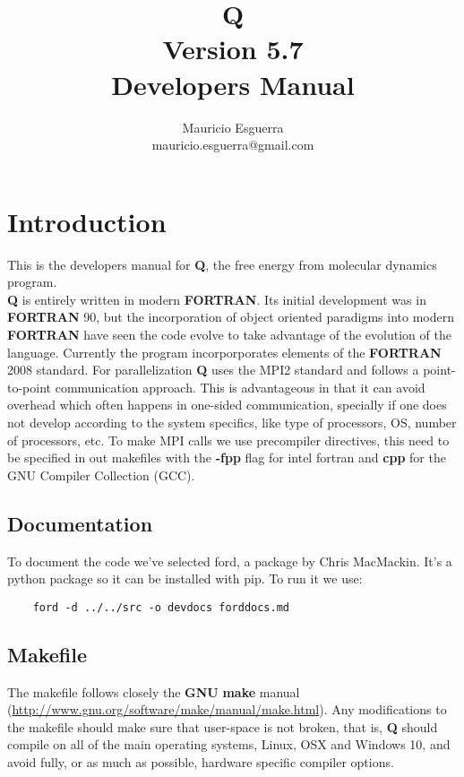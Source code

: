 \documentclass[10pt, oneside, pdftex]{article}
\title{Q\\
    \LARGE Version 5.7 \\
    \LARGE \vspace*{-10pt}Developers Manual\vspace*{10pt}}
\author{
  \vspace{10pt}
  Mauricio Esguerra \\
  \vspace{4pt}
  mauricio.esguerra@gmail.com \\
  \vspace{20pt}
  }
\makeatletter
\def\printtitle{
{\color{bl} \centering \Huge \textbf{\@title}\par}} %
\def\printauthor{                        %
{\centering \small \@author}}            %
\makeatother
\begin{document}
\printtitle
\printauthor
\tableofcontents
%

\vspace{20pt}
\section{Introduction}
This is  the developers manual  for \textbf{Q}, the free  energy from
molecular dynamics program.\\
\noindent \textbf{Q}  is entirely written in  modern \textbf{FORTRAN}.
Its  initial   development  was   in  \textbf{FORTRAN}  90,   but  the
incorporation    of   object    oriented    paradigms   into    modern
\textbf{FORTRAN} have  seen the code  evolve to take advantage  of the
evolution  of the  language.   Currently  the program  incorporporates
elements of  the \textbf{FORTRAN}  2008 standard.  For parallelization
\textbf{Q}  uses  the  MPI2  standard  and  follows  a  point-to-point
communication  approach. This  is advantageous  in that  it can  avoid
overhead which often happens  in one-sided communication, specially if
one does not  develop according to the system specifics,  like type of
processors, OS, number of processors, etc.
To make MPI calls we use precompiler directives, this need to be
specified in out makefiles with the \textbf{-fpp} flag for intel
fortran and \textbf{cpp} for the GNU Compiler Collection (GCC).


\subsection{Documentation}
\label{documentation}
To document the code we've selected ford, a package by Chris
MacMackin. It's a python package so it can be installed with pip.
To run it we use:
\begin{Verbatim}
    ford -d ../../src -o devdocs forddocs.md
\end{Verbatim}

\subsection{Makefile}
\label{makefile}
The  makefile follows  closely the  \textbf{GNU} \textbf{make}  manual
(\url{http://www.gnu.org/software/make/manual/make.html}).         Any
modifications to the makefile should  make sure that user-space is not
broken,  that  is,  \textbf{Q}  should  compile on  all  of  the  main
operating systems, Linux,  OSX and Windows 10, and avoid  fully, or as
much as possible, hardware specific compiler options.\\
\end{document}
